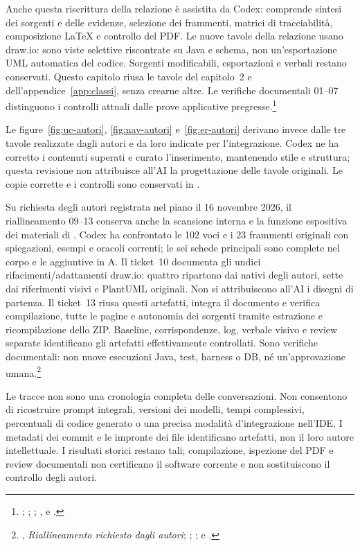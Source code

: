 Anche questa riscrittura della relazione è assistita da Codex: comprende
sintesi dei sorgenti e delle evidenze, selezione dei frammenti, matrici di
tracciabilità, composizione LaTeX e controllo del PDF. Le nuove tavole della
relazione usano draw.io: sono viste selettive riscontrate su Java e schema,
non un'esportazione UML automatica del codice. Sorgenti modificabili,
esportazioni e verbali restano conservati. Questo capitolo riusa le tavole
del capitolo~2 e dell'appendice~\ref{app:classi}, senza crearne altre.
Le verifiche documentali 01--07 distinguono i controlli attuali dalle
prove applicative pregresse.\footnote{\raggedright {};
;
;
,
e .}

Le figure~\ref{fig:uc-autori}, \ref{fig:nav-autori} e~\ref{fig:er-autori}
derivano invece dalle tre tavole realizzate dagli autori e da loro indicate
per l'integrazione. Codex ne ha corretto i contenuti superati e curato
l'inserimento, mantenendo stile e struttura; questa revisione non attribuisce
all'AI la progettazione delle tavole originali. Le copie corrette e i
controlli sono conservati in .

Su richiesta degli autori registrata nel piano il 16 novembre 2026,
il riallineamento 09--13 conserva anche la scansione interna e la funzione
espositiva dei materiali di . Codex ha confrontato
le 102 voci e i 23 frammenti originali con spiegazioni, esempi e oracoli
correnti; le sei schede principali sono complete nel corpo e le aggiuntive
in A. Il ticket~10 documenta gli undici rifacimenti/adattamenti draw.io:
quattro ripartono dai nativi degli autori, sette dai riferimenti visivi
e PlantUML originali. Non si attribuiscono all'AI i disegni di partenza.
Il ticket~13 riusa questi artefatti, integra il documento e verifica
compilazione, tutte le pagine e autonomia dei sorgenti tramite estrazione
e ricompilazione dello ZIP. Baseline, corrispondenze, log, verbale visivo
e review separate identificano gli artefatti effettivamente controllati.
Sono verifiche documentali: non nuove esecuzioni Java, test, harness o DB,
né un'approvazione umana.\footnote{\raggedright
{}, \emph{Riallineamento richiesto dagli autori};
;
;
 e
.}

Le tracce non sono una cronologia completa delle conversazioni. Non
consentono di ricostruire prompt integrali, versioni dei modelli, tempi
complessivi, percentuali di codice generato o una precisa modalità
d'integrazione nell'IDE. I metadati dei commit e le impronte dei file
identificano artefatti, non il loro autore intellettuale. I risultati
storici restano tali; compilazione, ispezione del PDF e review documentali
non certificano il software corrente e non sostituiscono il controllo
degli autori.
\endgroup
